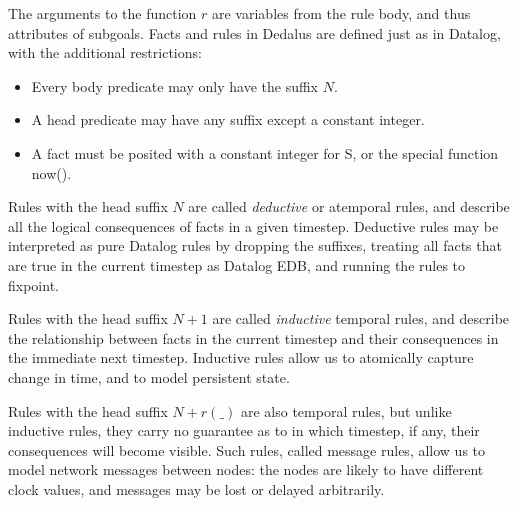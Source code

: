 
The arguments to the function $r$ are variables from the rule body, and thus attributes of subgoals.  Facts and rules in Dedalus are 
defined just as in Datalog, with the additional restrictions:

\begin{itemize}
\item Every body predicate may only have the suffix $N$.
\item A head predicate may have any suffix except a constant integer.
\item A fact must be posited with a constant integer for S, or the special function now().
\end{itemize}
Rules with the head suffix $N$ are called \emph{deductive} or atemporal rules, and describe all the logical consequences of facts in a given 
timestep. Deductive rules may be interpreted as pure Datalog rules by dropping the suffixes, treating all facts that are true in the current 
timestep as Datalog EDB, and running the rules to fixpoint.

Rules with the head suffix $N + 1$ are called \emph{inductive} temporal rules, and describe the relationship between facts in the current timestep 
and their consequences in the immediate next timestep. Inductive rules allow us to atomically capture change in time, and to model persistent state.

Rules with the head suffix $N+r(\_)$ are also temporal rules, but unlike inductive rules, they carry no guarantee as to in which timestep, if any, 
their consequences will become visible. Such rules, called message rules, allow us to model network messages between nodes: the nodes 
are likely to have different clock values, and messages may be lost or delayed arbitrarily.


